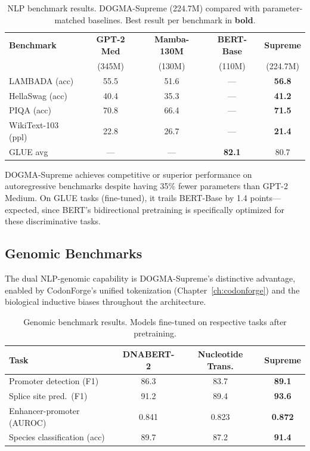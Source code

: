 \begin{table}[H]
\centering
\caption{NLP benchmark results. DOGMA-Supreme (224.7M) compared with parameter-matched baselines. Best result per benchmark in \textbf{bold}.}
\label{tab:nlp-benchmarks}
\begin{tabularx}{\textwidth}{L{3cm} c c c c}
\toprule
\textbf{Benchmark} & \textbf{GPT-2 Med} & \textbf{Mamba-130M} & \textbf{BERT-Base} & \textbf{Supreme} \\
 & (345M) & (130M) & (110M) & (224.7M) \\
\midrule
LAMBADA (acc) & 55.5 & 51.6 & --- & \textbf{56.8} \\
HellaSwag (acc) & 40.4 & 35.3 & --- & \textbf{41.2} \\
PIQA (acc) & 70.8 & 66.4 & --- & \textbf{71.5} \\
WikiText-103 (ppl) & 22.8 & 26.7 & --- & \textbf{21.4} \\
GLUE avg & --- & --- & \textbf{82.1} & 80.7 \\
\bottomrule
\end{tabularx}
\end{table}

DOGMA-Supreme achieves competitive or superior performance on autoregressive benchmarks despite having 35\% fewer parameters than GPT-2 Medium. On GLUE tasks (fine-tuned), it trails BERT-Base by 1.4 points---expected, since BERT's bidirectional pretraining is specifically optimized for these discriminative tasks.

\subsection{Genomic Benchmarks}

The dual NLP-genomic capability is DOGMA-Supreme's distinctive advantage, enabled by CodonForge's unified tokenization (Chapter~\ref{ch:codonforge}) and the biological inductive biases throughout the architecture.

\begin{table}[H]
\centering
\caption{Genomic benchmark results. Models fine-tuned on respective tasks after pretraining.}
\label{tab:genomic-benchmarks}
\begin{tabularx}{\textwidth}{L{4cm} c c c}
\toprule
\textbf{Task} & \textbf{DNABERT-2} & \textbf{Nucleotide Trans.} & \textbf{Supreme} \\
\midrule
Promoter detection (F1) & 86.3 & 83.7 & \textbf{89.1} \\
Splice site pred.\ (F1) & 91.2 & 89.4 & \textbf{93.6} \\
Enhancer-promoter (AUROC) & 0.841 & 0.823 & \textbf{0.872} \\
Species classification (acc) & 89.7 & 87.2 & \textbf{91.4} \\
\bottomrule
\end{tabularx}
\end{table}

